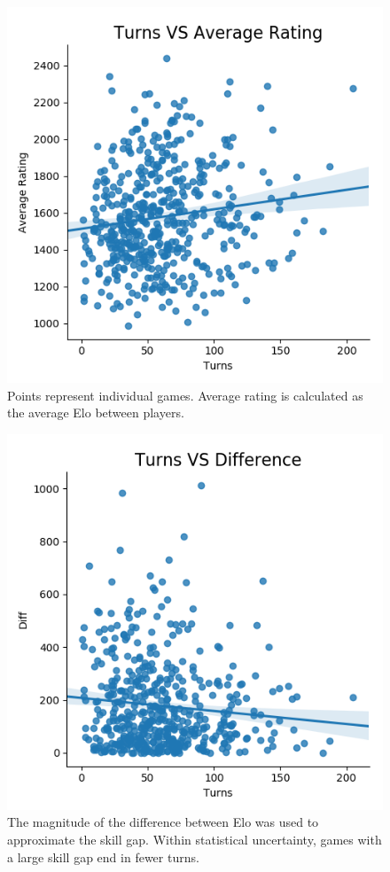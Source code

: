 \documentclass[reprint,
 amsmath,amssymb,nobibnotes,
 aps, floatfix]{revtex4-1}
\begin{document}
\begin{figure}
    \centering
    \includegraphics[scale=.5]{image4.png}
    \caption{Points represent individual games. Average rating is calculated as the average Elo between players.}
    \label{fig:elo_turn}
\end{figure}


\begin{figure}
    \centering
    \includegraphics[scale=.5]{image6.png}
    \caption{The magnitude of the difference between Elo was used to approximate the skill gap. Within statistical uncertainty, games with a large skill gap end in fewer turns.}
    \label{fig:elo_diff_turn}
\end{figure}
\end{document}
